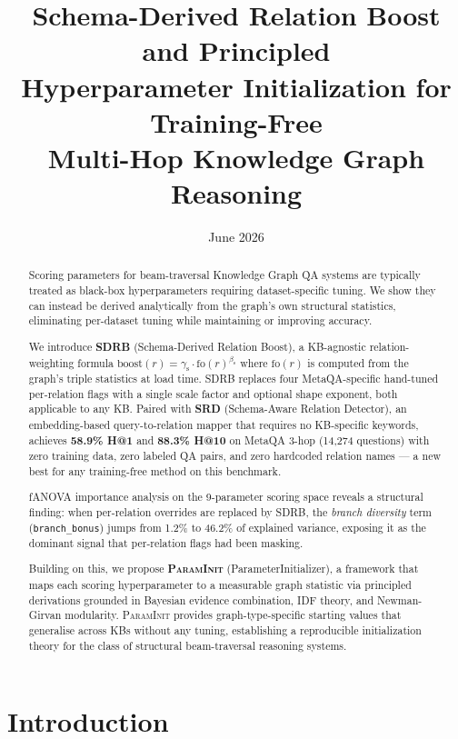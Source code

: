 \documentclass[10pt,twocolumn]{article}
\title{\textbf{Schema-Derived Relation Boost and Principled\\
Hyperparameter Initialization for Training-Free\\
Multi-Hop Knowledge Graph Reasoning}}
\date{June 2026}
\newcommand{\gS}{\gamma_{\mathrm{s}}}   %
\newcommand{\bS}{\beta_{\mathrm{s}}}    %
\newcommand{\fo}[1]{\mathrm{fo}(#1)}    %
\newcommand{\SDRB}{\textsc{SDRB}}
\newcommand{\SRD}{\textsc{SRD}}
\newcommand{\PI}{\textsc{ParamInit}}
\newcommand{\fanova}{f\textsc{ANOVA}}
\begin{document}
\maketitle

\begin{abstract}
Scoring parameters for beam-traversal Knowledge Graph QA systems are typically
treated as black-box hyperparameters requiring dataset-specific tuning.
We show they can instead be derived analytically from the graph's own structural
statistics, eliminating per-dataset tuning while maintaining or improving accuracy.

We introduce \textbf{\SDRB{}} (Schema-Derived Relation Boost), a KB-agnostic
relation-weighting formula $\mathrm{boost}(r) = \gS \cdot \fo{r}^{\bS}$ where
$\fo{r}$ is computed from the graph's triple statistics at load time.
\SDRB{} replaces four MetaQA-specific hand-tuned per-relation flags with a
single scale factor and optional shape exponent, both applicable to any KB.
Paired with \textbf{\SRD{}} (Schema-Aware Relation Detector), an embedding-based
query-to-relation mapper that requires no KB-specific keywords,
\CEREBRUM{} achieves \textbf{58.9\% H@1} and \textbf{88.3\% H@10} on
MetaQA 3-hop (14,274 questions) with zero training data, zero labeled QA pairs,
and zero hardcoded relation names --- a new best for any training-free method
on this benchmark.

\fanova{} importance analysis on the 9-parameter scoring space reveals a
structural finding: when per-relation overrides are replaced by \SDRB{}, the
\emph{branch diversity} term (\texttt{branch\_bonus}) jumps from 1.2\% to
46.2\% of explained variance, exposing it as the dominant signal that
per-relation flags had been masking.

Building on this, we propose \textbf{\PI{}} (ParameterInitializer), a
framework that maps each scoring hyperparameter to a measurable graph statistic
via principled derivations grounded in Bayesian evidence combination, IDF theory,
and Newman-Girvan modularity. \PI{} provides graph-type-specific starting values
that generalise across KBs without any tuning, establishing a reproducible
initialization theory for the class of structural beam-traversal reasoning systems.
\end{abstract}

\section{Introduction}
\label{sec:intro}
\end{document}
